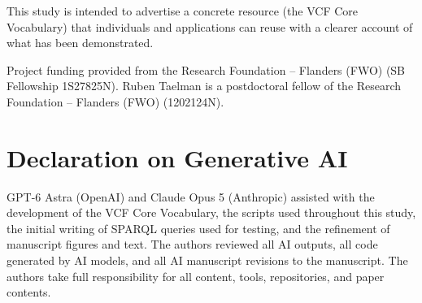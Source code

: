 \documentclass{ceurart}
\begin{document}
This study is intended to advertise a concrete resource (the VCF Core Vocabulary) that individuals and applications can reuse with a clearer account of what has been demonstrated.

\begin{acknowledgments}
Project funding provided from the Research Foundation -- Flanders (FWO) (SB Fellowship 1S27825N).
Ruben Taelman is a postdoctoral fellow of the Research Foundation -- Flanders (FWO) (1202124N).
\end{acknowledgments}

\section*{Declaration on Generative AI}
GPT-6 Astra (OpenAI) and Claude Opus 5 (Anthropic) assisted with the development of the VCF Core Vocabulary, the scripts used throughout this study, the initial writing of SPARQL queries used for testing, and the refinement of manuscript figures and text. The authors reviewed all AI outputs, all code generated by AI models, and all AI manuscript revisions to the manuscript. The authors take full responsibility for all content, tools, repositories, and paper contents.

\label{endofmain}

{
}
\end{document}
